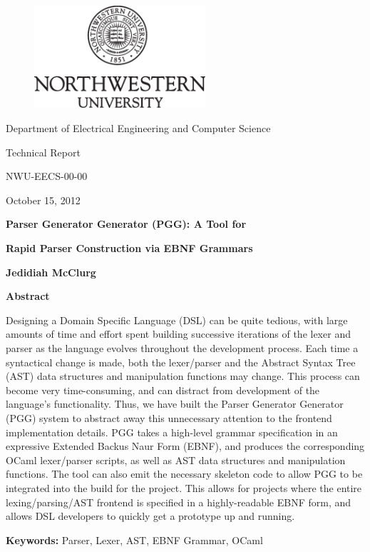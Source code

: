 \documentclass{article}
\begin{document}
\vspace{-3.0in}
\begin{figure}
\centering
\includegraphics[width=2.5in]{nwu}
\end{figure}

%
\centerline{\Large Department of Electrical Engineering and Computer Science}
\vspace{0.2in}

\centerline{\Large { Technical Report}}
\vspace{0.05in}
\centerline{\Large { NWU-EECS-00-00}}
\vspace{0.05in}
\centerline{\Large { October 15, 2012}}
\vspace{0.3in}

\centerline{\Large {\bf Parser Generator Generator (PGG): A Tool for}}
\centerline{\Large {\bf Rapid Parser Construction via EBNF Grammars}}
\vspace{0.3in}
\centerline{\large {\bf Jedidiah McClurg}}
\vspace{0.8in}

\centerline{\large {\bf Abstract}}
\vspace{0.15in}
Designing a Domain Specific Language (DSL) can be quite tedious,
with large amounts of time and effort spent building successive
iterations of the lexer and parser as the language evolves
throughout the development process.
Each time a syntactical change is made, both the lexer/parser and
the Abstract Syntax Tree (AST) data structures and manipulation
functions may change.  This process can become very
time-consuming, and can distract from development of the
language's functionality.  Thus, we have built the Parser
Generator Generator (PGG) system to abstract away this unnecessary
attention to the frontend implementation details.  PGG takes a high-level
grammar specification in an expressive Extended Backus Naur Form (EBNF),
and produces the corresponding OCaml lexer/parser scripts, as
well as AST data structures and manipulation functions.  The
tool can also emit the necessary skeleton code to allow
PGG to be integrated into the build for the project.  This
allows for projects where the entire lexing/parsing/AST
frontend is specified in a highly-readable EBNF form,
and allows DSL developers to quickly get a prototype up and running.

\vspace{0.5in}
{\bf Keywords:} Parser, Lexer, AST, EBNF Grammar, OCaml
\end{document}
